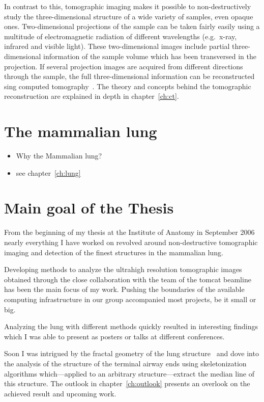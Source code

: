In contrast to this, tomographic imaging makes it possible to non-destructively study the three-dimensional structure of a wide variety of samples, even opaque ones. Two-dimensional projections of the sample can be taken fairly easily using a multitude of electromagnetic radiation of different wavelengths (e.g.\ x-ray, infrared and visible light). These two-dimensional images include partial three-dimensional information of the sample volume which has been transversed in the projection. If several projection images are acquired from different directions through the sample, the full three-dimensional information can be reconstructed sing computed tomography~\cite{Hounsfield1976a}. The theory and concepts behind the tomographic reconstruction are explained in depth in chapter~\ref{ch:ct}.

\section{The mammalian lung}
\begin{itemize}
	\item Why the Mammalian lung?
	\item see chapter~\ref{ch:lung}
\end{itemize}

\section{Main goal of the Thesis}
From the beginning of my thesis at the Institute of Anatomy in September 2006 nearly everything I have worked on revolved around non-destructive tomographic imaging and detection of the finest structures in the mammalian lung.

Developing methods to analyze the ultrahigh resolution tomographic images obtained through the close collaboration with the team of the \ac{tomcat} beamline has been the main focus of my work. Pushing the boundaries of the available computing infrastructure in our group accompanied most projects, be it small or big.

Analyzing the lung with different methods quickly resulted in interesting findings which I was able to present as posters or talks at different conferences.

Soon I was intrigued by the fractal geometry of the lung structure~\cite{Weibel1991,Tsuda2002} and dove into the analysis of the structure of the terminal airway ends using skeletonization algorithms which---applied to an arbitrary structure---extract the median line of this structure. The outlook in chapter~\ref{ch:outlook} presents an overlook on the achieved result and upcoming work.

